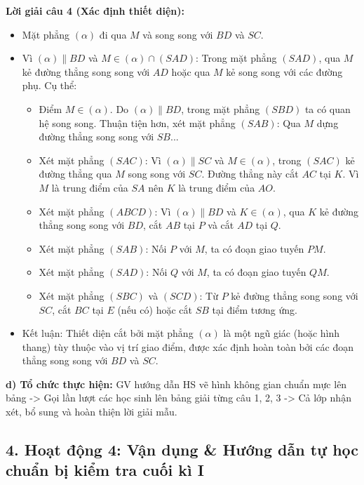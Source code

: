 \documentclass[12pt, a4paper]{article}
\begin{document}
\noindent \textbf{Lời giải câu 4 (Xác định thiết diện):}
\begin{itemize}
    \item Mặt phẳng $(\alpha)$ đi qua $M$ và song song với $BD$ và $SC$.
    \item Vì $(\alpha) \parallel BD$ và $M \in (\alpha) \cap (SAD)$:
    Trong mặt phẳng $(SAD)$, qua $M$ kẻ đường thẳng song song với $AD$ hoặc qua $M$ kẻ song song với các đường phụ. Cụ thể:
    \begin{itemize}
        \item Điểm $M \in (\alpha)$. Do $(\alpha) \parallel BD$, trong mặt phẳng $(SBD)$ ta có quan hệ song song. Thuận tiện hơn, xét mặt phẳng $(SAB)$: Qua $M$ dựng đường thẳng song song với $SB$...
        \item Xét mặt phẳng $(SAC)$: Vì $(\alpha) \parallel SC$ và $M \in (\alpha)$, trong $(SAC)$ kẻ đường thẳng qua $M$ song song với $SC$. Đường thẳng này cắt $AC$ tại $K$. Vì $M$ là trung điểm của $SA$ nên $K$ là trung điểm của $AO$.
        \item Xét mặt phẳng $(ABCD)$: Vì $(\alpha) \parallel BD$ và $K \in (\alpha)$, qua $K$ kẻ đường thẳng song song với $BD$, cắt $AB$ tại $P$ và cắt $AD$ tại $Q$.
        \item Xét mặt phẳng $(SAB)$: Nối $P$ với $M$, ta có đoạn giao tuyến $PM$.
        \item Xét mặt phẳng $(SAD)$: Nối $Q$ với $M$, ta có đoạn giao tuyến $QM$.
        \item Xét mặt phẳng $(SBC)$ và $(SCD)$: Từ $P$ kẻ đường thẳng song song với $SC$, cắt $BC$ tại $E$ (nếu có) hoặc cắt $SB$ tại điểm tương ứng.
    \end{itemize}
    \item Kết luận: Thiết diện cắt bởi mặt phẳng $(\alpha)$ là một ngũ giác (hoặc hình thang) tùy thuộc vào vị trí giao điểm, được xác định hoàn toàn bởi các đoạn thẳng song song với $BD$ và $SC$.
\end{itemize}

\noindent \textbf{d) Tổ chức thực hiện:}
GV hướng dẫn HS vẽ hình không gian chuẩn mực lên bảng -> Gọi lần lượt các học sinh lên bảng giải từng câu 1, 2, 3 -> Cả lớp nhận xét, bổ sung và hoàn thiện lời giải mẫu.

\subsection*{4. Hoạt động 4: Vận dụng & Hướng dẫn tự học chuẩn bị kiểm tra cuối kì I}
\end{document}
